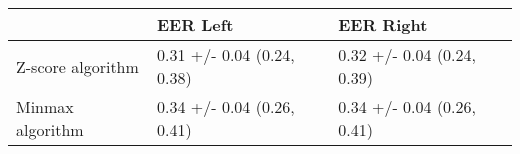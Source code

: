 \begin{tabular}{lll}
\toprule
{} &                    EER Left &                   EER Right \\
\midrule
Z-score algorithm &  0.31 +/- 0.04 (0.24, 0.38) &  0.32 +/- 0.04 (0.24, 0.39) \\
Minmax algorithm  &  0.34 +/- 0.04 (0.26, 0.41) &  0.34 +/- 0.04 (0.26, 0.41) \\
\bottomrule
\end{tabular}
